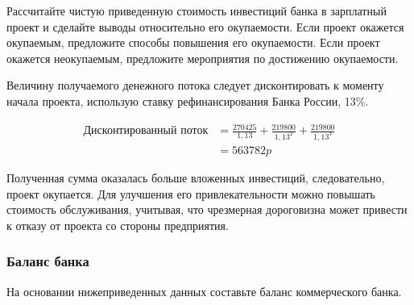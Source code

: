 \documentclass[12pt, table, a4paper,twoside]{exam}
\begin{document}
\begin{questions}
\begin{subparts}
\begin{solution}[12em]
	\end{solution}
	
	\subpart[5] Рассчитайте чистую приведенную стоимость инвестиций банка в зарплатный проект и сделайте выводы относительно его окупаемости. Если проект окажется окупаемым, предложите способы повышения его окупаемости. Если проект окажется неокупаемым,  предложите мероприятия по достижению окупаемости.
	
	\begin{solution}[12em]
	
		Величину получаемого денежного потока следует дисконтировать к моменту начала проекта, использую ставку рефинансирования Банка России, 13\%.
		
		\begin{align*}
		\text{Дисконтированный поток} &= \frac{270425}{1,13}  + \frac{219800}{1,13^2} + \frac{219800}{1,13^3} \\
		&= 563 782p
		\end{align*}
		
		
		Полученная сумма оказалась больше вложенных инвестиций, следовательно, проект окупается. Для улучшения его привлекательности можно повышать стоимость обслуживания, учитывая, что чрезмерная дороговизна может привести к отказу от проекта со стороны предприятия.
			
	\end{solution}
	
\end{subparts}
\addpoints

\subsubsection{Баланс банка}
\question[10] На основании нижеприведенных данных составьте баланс коммерческого банка.


\end{questions}
\end{document}
